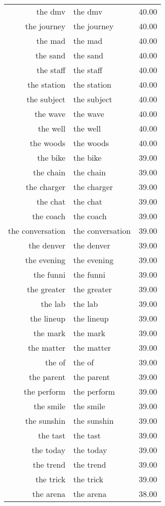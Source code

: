 \begin{table}[ht]
\begin{tabular}{rlr}
  the dmv & the dmv & 40.00 \\ 
  the journey & the journey & 40.00 \\ 
  the mad & the mad & 40.00 \\ 
  the sand & the sand & 40.00 \\ 
  the staff & the staff & 40.00 \\ 
  the station & the station & 40.00 \\ 
  the subject & the subject & 40.00 \\ 
  the wave & the wave & 40.00 \\ 
  the well & the well & 40.00 \\ 
  the woods & the woods & 40.00 \\ 
  the bike & the bike & 39.00 \\ 
  the chain & the chain & 39.00 \\ 
  the charger & the charger & 39.00 \\ 
  the chat & the chat & 39.00 \\ 
  the coach & the coach & 39.00 \\ 
  the conversation & the conversation & 39.00 \\ 
  the denver & the denver & 39.00 \\ 
  the evening & the evening & 39.00 \\ 
  the funni & the funni & 39.00 \\ 
  the greater & the greater & 39.00 \\ 
  the lab & the lab & 39.00 \\ 
  the lineup & the lineup & 39.00 \\ 
  the mark & the mark & 39.00 \\ 
  the matter & the matter & 39.00 \\ 
  the of & the of & 39.00 \\ 
  the parent & the parent & 39.00 \\ 
  the perform & the perform & 39.00 \\ 
  the smile & the smile & 39.00 \\ 
  the sunshin & the sunshin & 39.00 \\ 
  the tast & the tast & 39.00 \\ 
  the today & the today & 39.00 \\ 
  the trend & the trend & 39.00 \\ 
  the trick & the trick & 39.00 \\ 
  the arena & the arena & 38.00 \\ 

\end{tabular}
\end{table}
